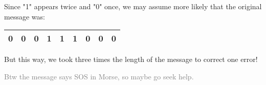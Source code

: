 \begin{frame}
{\begin{center}
    \end{center}
    }
    \pause
    \bigskip
    
    Since "1" appears twice and "0" once, we may assume more likely that the original message was:
    \pause
    \bigskip
    
    \begin{center}
    \begin{tabular}{|c|c|c|c|c|c|c|c|c|}
        \hline
        0 & 0 & 0 & 1 & \cellcolor{green!20} 1 & 1 & 0 & 0 & 0 \\
        \hline
    \end{tabular}
    \end{center}
    \pause
    \bigskip
    
    But this way, we took three times the length of the message to correct one error!
    
    \bigskip
    \pause
    \textcolor{gray}{Btw the message says SOS in Morse, so maybe go seek help.}
    \end{frame}
    
